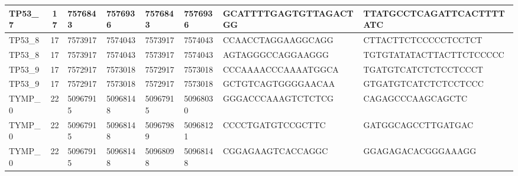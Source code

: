 \begin{landscape}
\begin{longtable}{| p{} | p{} | p{} | p{} | p{} | p{} | p{} | p{} |}
\multicolumn{1}{|l|}{TP53\_7}    & \multicolumn{1}{c|}{17} & \multicolumn{1}{l|}{7576843}   & \multicolumn{1}{l|}{7576936}   & \multicolumn{1}{l|}{7576843}   & \multicolumn{1}{l|}{7576936}   & \multicolumn{1}{l|}{GCATTTTGAGTGTTAGACTGG}           & \multicolumn{1}{l|}{TTATGCCTCAGATTCACTTTTATC}      \\ \hline
\multicolumn{1}{|l|}{TP53\_8}    & \multicolumn{1}{c|}{17} & \multicolumn{1}{l|}{7573917}   & \multicolumn{1}{l|}{7574043}   & \multicolumn{1}{l|}{7573917}   & \multicolumn{1}{l|}{7574043}   & \multicolumn{1}{l|}{CCAACCTAGGAAGGCAGG}              & \multicolumn{1}{l|}{CTTACTTCTCCCCCTCCTCT}          \\ \hline
\multicolumn{1}{|l|}{TP53\_8}    & \multicolumn{1}{c|}{17} & \multicolumn{1}{l|}{7573917}   & \multicolumn{1}{l|}{7574043}   & \multicolumn{1}{l|}{7573917}   & \multicolumn{1}{l|}{7574043}   & \multicolumn{1}{l|}{AGTAGGGCCAGGAAGGG}               & \multicolumn{1}{l|}{TGTGTATATACTTACTTCTCCCCC}      \\ \hline
\multicolumn{1}{|l|}{TP53\_9}    & \multicolumn{1}{c|}{17} & \multicolumn{1}{l|}{7572917}   & \multicolumn{1}{l|}{7573018}   & \multicolumn{1}{l|}{7572917}   & \multicolumn{1}{l|}{7573018}   & \multicolumn{1}{l|}{CCCAAAACCCAAAATGGCA}             & \multicolumn{1}{l|}{TGATGTCATCTCTCCTCCCT}          \\ \hline
\multicolumn{1}{|l|}{TP53\_9}    & \multicolumn{1}{c|}{17} & \multicolumn{1}{l|}{7572917}   & \multicolumn{1}{l|}{7573018}   & \multicolumn{1}{l|}{7572917}   & \multicolumn{1}{l|}{7573018}   & \multicolumn{1}{l|}{GCTGTCAGTGGGGAACAA}              & \multicolumn{1}{l|}{GTGATGTCATCTCTCCTCCC}          \\ \hline
\multicolumn{1}{|l|}{TYMP\_0}    & \multicolumn{1}{c|}{22} & \multicolumn{1}{l|}{50967915}  & \multicolumn{1}{l|}{50968148}  & \multicolumn{1}{l|}{50967915}  & \multicolumn{1}{l|}{50968030}  & \multicolumn{1}{l|}{GGGACCCAAAGTCTCTCG}              & \multicolumn{1}{l|}{CAGAGCCCAAGCAGCTC}             \\ \hline
\multicolumn{1}{|l|}{TYMP\_0}    & \multicolumn{1}{c|}{22} & \multicolumn{1}{l|}{50967915}  & \multicolumn{1}{l|}{50968148}  & \multicolumn{1}{l|}{50967989}  & \multicolumn{1}{l|}{50968121}  & \multicolumn{1}{l|}{CCCCTGATGTCCGCTTC}               & \multicolumn{1}{l|}{GATGGCAGCCTTGATGAC}            \\ \hline
\multicolumn{1}{|l|}{TYMP\_0}    & \multicolumn{1}{c|}{22} & \multicolumn{1}{l|}{50967915}  & \multicolumn{1}{l|}{50968148}  & \multicolumn{1}{l|}{50968098}  & \multicolumn{1}{l|}{50968148}  & \multicolumn{1}{l|}{CGGAGAAGTCACCAGGC}               & \multicolumn{1}{l|}{GGAGAGACACGGGAAAGG}            \\ \hline

\end{longtable}
\end{landscape}

